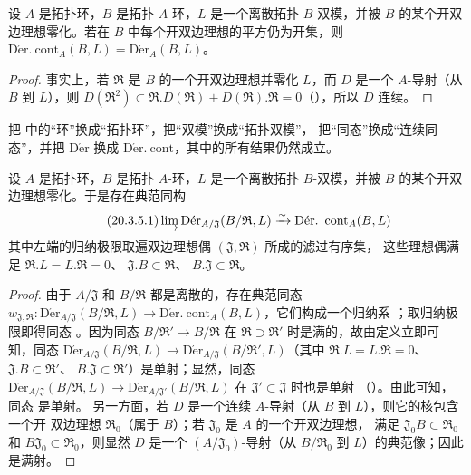 \begin{proposition}[20.3.3]
\label{0.20.3.3-fr}
设 $A$ 是拓扑环，$B$ 是拓扑 $A$-环，$L$ 是一个离散拓扑 $B$-双模，并被
$B$ 的某个开双边理想零化。若在 $B$ 中每个开双边理想的平方仍为开集，则
$\operatorname{D\acute{e}r.\ cont}_A(B,L)=\operatorname{D\acute{e}r}_A(B,L)$。
\end{proposition}

\begin{proof}
事实上，若 $\mathfrak{R}$ 是 $B$ 的一个开双边理想并零化 $L$，而 $D$ 是一个
$A$-导射（从 $B$ 到 $L$），则
$D(\mathfrak{R}^2)\subset\mathfrak{R}.D(\mathfrak{R})+
D(\mathfrak{R}).\mathfrak{R}=0$（），所以 $D$ 连续。
\end{proof}

\begin{env}[20.3.4]
\label{0.20.3.4-fr}
把  中的“环”换成“拓扑环”，把“双模”换成“拓扑双模”，
把“同态”换成“连续同态”，并把 $\operatorname{D\acute{e}r}$ 换成
$\operatorname{D\acute{e}r.\ cont}$，其中的所有结果仍然成立。
\end{env}

\begin{proposition}[20.3.5]
\label{0.20.3.5-fr}
设 $A$ 是拓扑环，$B$ 是拓扑 $A$-环，$L$ 是一个离散拓扑 $B$-双模，并被
$B$ 的某个开双边理想零化。于是存在典范同构
\begin{equation}
\tag{20.3.5.1}
\label{0.20.3.5.1-fr}
  \varinjlim\operatorname{D\acute{e}r}_{A/\mathfrak{J}}
  (B/\mathfrak{R},L)\xrightarrow{\sim}
  \operatorname{D\acute{e}r.\ cont}_A(B,L)
\end{equation}
其中左端的归纳极限取遍双边理想偶 $(\mathfrak{J},\mathfrak{R})$ 所成的滤过有序集，
这些理想偶满足
$\mathfrak{R}.L=L.\mathfrak{R}=0$、
$\mathfrak{J}.B\subset\mathfrak{R}$、
$B.\mathfrak{J}\subset\mathfrak{R}$。
\end{proposition}

\begin{proof}
由于 $A/\mathfrak{J}$ 和 $B/\mathfrak{R}$ 都是离散的，存在典范同态
$w_{\mathfrak{J},\mathfrak{R}}:
\operatorname{D\acute{e}r}_{A/\mathfrak{J}}(B/\mathfrak{R},L)\to
\operatorname{D\acute{e}r.\ cont}_A(B,L)$，它们构成一个归纳系
；取归纳极限即得同态 。因为同态
$B/\mathfrak{R}'\to B/\mathfrak{R}$ 在 $\mathfrak{R}\supset\mathfrak{R}'$
时是满的，故由定义立即可知，同态
$\operatorname{D\acute{e}r}_{A/\mathfrak{J}}(B/\mathfrak{R},L)\to
\operatorname{D\acute{e}r}_{A/\mathfrak{J}}(B/\mathfrak{R}',L)$（其中
$\mathfrak{R}.L=L.\mathfrak{R}=0$、
$\mathfrak{J}.B\subset\mathfrak{R}'$、
$B.\mathfrak{J}\subset\mathfrak{R}'$）是单射；显然，同态
$\operatorname{D\acute{e}r}_{A/\mathfrak{J}}(B/\mathfrak{R},L)\to
\operatorname{D\acute{e}r}_{A/\mathfrak{J}'}(B/\mathfrak{R},L)$ 在
$\mathfrak{J}'\subset\mathfrak{J}$ 时也是单射
（）。由此可知，同态  是单射。
另一方面，若 $D$ 是一个连续 $A$-导射（从 $B$ 到 $L$），则它的核包含一个开
双边理想 $\mathfrak{R}_0$（属于 $B$）；若 $\mathfrak{J}_0$ 是 $A$ 的一个开双边理想，
满足 $\mathfrak{J}_0B\subset\mathfrak{R}_0$ 和
$B\mathfrak{J}_0\subset\mathfrak{R}_0$，则显然 $D$ 是一个
$(A/\mathfrak{J}_0)$-导射（从 $B/\mathfrak{R}_0$ 到 $L$）的典范像；因此
 是满射。
\end{proof}

